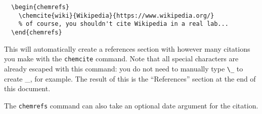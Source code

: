 \documentclass{lab_report}
\begin{document}
\begin{verbatim}
  \begin{chemrefs}
    \chemcite{wiki}{Wikipedia}{https://www.wikipedia.org/}
    % of course, you shouldn't cite Wikipedia in a real lab...
  \end{chemrefs}
\end{verbatim}

This will automatically create a references section with however many citations you make with the \verb|chemcite| command. Note that all special characters are already escaped with this command: you do not need to manually type \verb|\_| to create \_, for example. The result of this is the ``References'' section at the end of this document.

The \verb|chemrefs| command can also take an optional date argument for the citation.

\begin{chemrefs}
\end{chemrefs}
\end{document}

